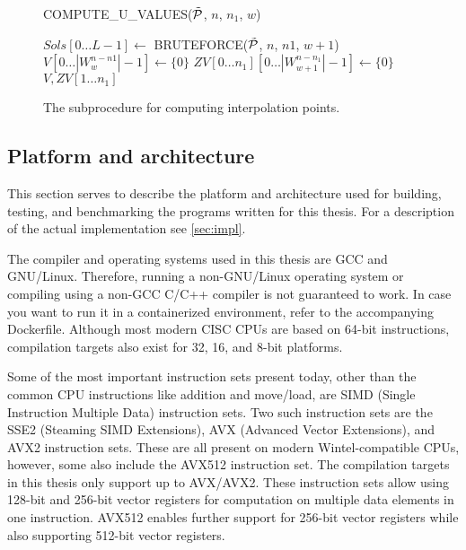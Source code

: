 \begin{figure}[ht]
    \centering
    \begin{alg}
        \caption{COMPUTE\_U\_VALUES($\Tilde{\mathcal{P}}$, $n$, $n_1$, $w$)} \label{alg:uvalue}
        \label{alg:uvalues}
        $Sols[0\dots L - 1] \gets$ BRUTEFORCE($\Tilde{\mathcal{P}}$, $n$, $n1$, $w + 1$)\; \label{alg:uvalues:bruteforce}
        $V[0\dots |W^{n - n1}_w| - 1] \gets \{0\}$\;
        $ZV[0\dots n_1][0\dots |W^{n - n_1}_{w + 1}| - 1] \gets \{0\}$\;
        \Return $V, ZV[1\dots n_1]$\;
    \end{alg}
    \caption{The subprocedure for computing interpolation points.}
\end{figure}


\subsection{Platform and architecture}

This section serves to describe the platform and architecture used for building, testing, and benchmarking the programs written for this thesis. For a description of the actual implementation see \cref{sec:impl}.

The compiler and operating systems used in this thesis are GCC and GNU/Linux. Therefore, running a non-GNU/Linux operating system or compiling using a non-GCC C/C++ compiler is not guaranteed to work. In case you want to run it in a containerized environment, refer to the accompanying Dockerfile. Although most modern CISC CPUs are based on 64-bit instructions, compilation targets also exist for 32, 16, and 8-bit platforms.

Some of the most important instruction sets present today, other than the common CPU instructions like addition and move/load, are SIMD (Single Instruction Multiple Data) instruction sets. Two such instruction sets are the SSE2 (Steaming SIMD Extensions), AVX (Advanced Vector Extensions), and AVX2 instruction sets. These are all present on modern Wintel-compatible CPUs, however, some also include the AVX512 instruction set. The compilation targets in this thesis only support up to AVX/AVX2. These instruction sets allow using 128-bit and 256-bit vector registers for computation on multiple data elements in one instruction. AVX512 enables further support for 256-bit vector registers while also supporting 512-bit vector registers.


